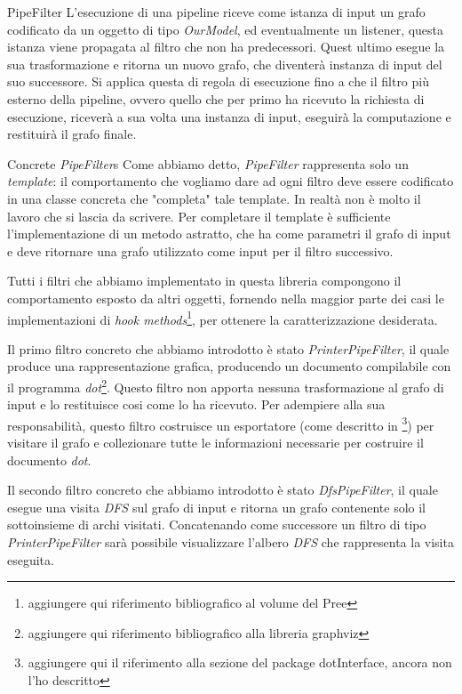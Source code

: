 \begin{paragraph}{PipeFilter}
  L'esecuzione di una pipeline riceve come istanza di input un grafo
  codificato da un oggetto di tipo \emph{OurModel}, ed eventualmente
  un listener, questa istanza viene propagata al filtro che non ha
  predecessori. Quest ultimo esegue la sua trasformazione e ritorna un
  nuovo grafo, che diventer\`a instanza di input del suo
  successore. Si applica questa di regola di esecuzione fino a che il
  filtro pi\`u esterno della pipeline, ovvero quello che per primo ha
  ricevuto la richiesta di esecuzione, ricever\`a a sua volta una
  instanza di input, eseguir\`a la computazione e restituir\`a il
  grafo finale.

\end{paragraph}

\begin{paragraph}{Concrete \emph{PipeFilter}s}
  Come abbiamo detto, \emph{PipeFilter} rappresenta solo un
  \emph{template}: il comportamento che vogliamo dare ad ogni filtro
  deve essere codificato in una classe concreta che "completa" tale
  template. In realt\`a non \`e molto il lavoro che si lascia da
  scrivere. Per completare il template \`e sufficiente
  l'implementazione di un metodo astratto, che ha come parametri il
  grafo di input e deve ritornare una grafo utilizzato come input per
  il filtro successivo.

  Tutti i filtri che abbiamo implementato in questa libreria
  compongono il comportamento esposto da altri oggetti, fornendo nella
  maggior parte dei casi le implementazioni di \emph{hook
    methods}\footnote{aggiungere qui riferimento bibliografico al
    volume del Pree}, per ottenere la caratterizzazione desiderata.

  Il primo filtro concreto che abbiamo introdotto \`e stato
  \emph{PrinterPipeFilter}, il quale produce una rappresentazione
  grafica, producendo un documento compilabile con il programma
  \emph{dot}\footnote{aggiungere qui riferimento bibliografico alla
    libreria graphviz}. Questo filtro non apporta nessuna
  trasformazione al grafo di input e lo restituisce cosi come lo ha
  ricevuto. Per adempiere alla sua responsabilit\`a, questo filtro
  costruisce un esportatore (come descritto in \footnote{aggiungere
    qui il riferimento alla sezione del package dotInterface, ancora
    non l'ho descritto}) per visitare il grafo e collezionare tutte le
  informazioni necessarie per costruire il documento \emph{dot}.

  Il secondo filtro concreto che abbiamo introdotto \`e stato
  \emph{DfsPipeFilter}, il quale esegue una visita \emph{DFS} sul
  grafo di input e ritorna un grafo contenente solo il sottoinsieme di
  archi visitati. Concatenando come successore un filtro di tipo
  \emph{PrinterPipeFilter} sar\`a possibile visualizzare l'albero
  \emph{DFS} che rappresenta la visita eseguita.


\end{paragraph}
